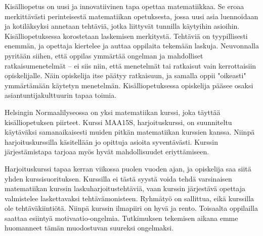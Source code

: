 Kisälliopetus on uusi ja innovatiivinen tapa opettaa matematiikkaa.
Se eroaa merkittävästi perinteisestä matematiikan opetuksesta, jossa uusi asia luennoidaan ja kotiläksyksi annetaan tehtäviä, jotka liittyvät tunnilla käytyihin asioihin.
Kisälliopetuksessa korostetaan laskemisen merkitystä.
Tehtäviä on tyypillisesti enemmän, ja opettaja kiertelee ja auttaa oppilaita tekemään laskuja.
Neuvonnalla pyritään siihen, että oppilas ymmärtää ongelman ja mahdolliset ratkaisumenetelmät -- ei siis niin, että menetelmät tai ratkaisut vain kerrottaisiin opiskelijalle.
Näin opiskelija itse päätyy ratkaisuun, ja samalla oppii "oikeasti" ymmärtämään käytetyn menetelmän.
Kisälli\-opetuksessa opiskelija pääsee osaksi asiantuntijakulttuurin tapaa toimia.\cite{hautala2012extreme,vihavainen2011extreme}

Helsingin Normaalilyseossa on yksi matematiikan kurssi, joka täyttää kisälliopetuksen piirteet.
Kurssi MAA15S, harjoituskurssi, on suunniteltu käytäväksi samanaikaisesti muiden pitkän matematiikan kurssien kanssa.
Niinpä harjoituskurssilla käsitellään jo opittuja asioita syventävästi.
Kurssin järjestämistapa tarjoaa myös hyvät mahdollisuudet eriyttämiseen.

Harjoituskurssi tapaa kerran viikossa puolen vuoden ajan, ja opiskelija saa siitä yhden kurssisuorituksen.
Kurssilla ei tästä syystä voida tehdä varsinaisen matematiikan kurssin laskuharjoitustehtäviä, vaan kurssin järjestävä opettaja valmistelee laskettavaksi tehtävämonisteen.
Ryhmätyö on sallittua, eikä kurssilla ole tehtäväkiintiötä.
Niinpä kurssin ilmapiiri on hyvä ja rento.
Toisaalta oppilailla saattaa esiintyä motivaatio-ongelmia.
Tutkimuksen tekemisen aikana emme huomanneet tämän muodostuvan suureksi ongelmaksi.
